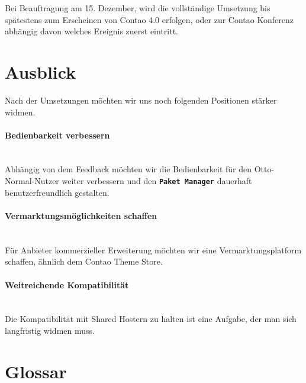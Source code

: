 \documentclass[
paper=a4,
draft=false,%
fontsize=10pt%
]{scrartcl}
\newcommand{\packageManager}{\textbf{\texttt{Paket Manager}}}
\begin{document}
Bei Beauftragung am 15. Dezember, wird die vollständige Umsetzung bis spätestens zum Erscheinen von Contao 4.0 erfolgen, oder zur Contao Konferenz abhängig davon welches Ereignis zuerst eintritt.

\newpage

%
%

\section{Ausblick}
\label{sec:forecast}

Nach der Umsetzungen möchten wir uns noch folgenden Positionen stärker widmen.

\paragraph{Bedienbarkeit verbessern} ~\\
Abhängig von dem Feedback möchten wir die Bedienbarkeit für den Otto-Normal-Nutzer weiter verbessern und den \packageManager{} dauerhaft benutzerfreundlich gestalten.

\paragraph{Vermarktungsmöglichkeiten schaffen} ~\\
Für Anbieter kommerzieller Erweiterung möchten wir eine Vermarktungsplatform schaffen, ähnlich dem Contao Theme Store.

\paragraph{Weitreichende Kompatibilität} ~\\
Die Kompatibilität mit  Shared Hostern zu halten ist eine Aufgabe, der man sich langfristig widmen muss.

\newpage

%
%

\section{Glossar}
\end{document}
